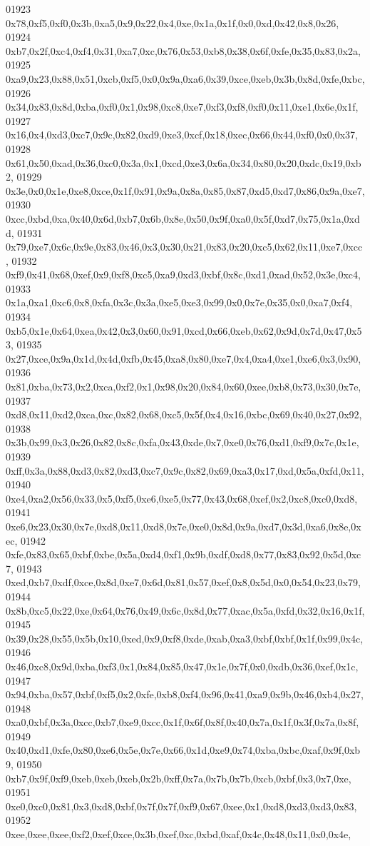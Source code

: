 \begin{DoxyCode}
01923   0x78,0xf5,0xf0,0x3b,0xa5,0x9,0x22,0x4,0xe,0x1a,0x1f,0x0,0xd,0x42,0x8,0x26,
01924   0xb7,0x2f,0xc4,0xf4,0x31,0xa7,0xc,0x76,0x53,0xb8,0x38,0x6f,0xfe,0x35,0x83,0x2a,
01925   0xa9,0x23,0x88,0x51,0xcb,0xf5,0x0,0x9a,0xa6,0x39,0xce,0xeb,0x3b,0x8d,0xfe,0xbc,
01926   0x34,0x83,0x8d,0xba,0xf0,0x1,0x98,0xc8,0xe7,0xf3,0xf8,0xf0,0x11,0xe1,0x6e,0x1f,
01927   0x16,0x4,0xd3,0xc7,0x9c,0x82,0xd9,0xe3,0xcf,0x18,0xec,0x66,0x44,0xf0,0x0,0x37,
01928   0x61,0x50,0xad,0x36,0xc0,0x3a,0x1,0xcd,0xe3,0x6a,0x34,0x80,0x20,0xdc,0x19,0xb2,
01929   0x3e,0x0,0x1e,0xe8,0xce,0x1f,0x91,0x9a,0x8a,0x85,0x87,0xd5,0xd7,0x86,0x9a,0xe7,
01930   0xcc,0xbd,0xa,0x40,0x6d,0xb7,0x6b,0x8e,0x50,0x9f,0xa0,0x5f,0xd7,0x75,0x1a,0xdd,
01931   0x79,0xe7,0x6c,0x9e,0x83,0x46,0x3,0x30,0x21,0x83,0x20,0xc5,0x62,0x11,0xe7,0xcc,
01932   0xf9,0x41,0x68,0xef,0x9,0xf8,0xc5,0xa9,0xd3,0xbf,0x8c,0xd1,0xad,0x52,0x3e,0xc4,
01933   0x1a,0xa1,0xc6,0x8,0xfa,0x3c,0x3a,0xe5,0xe3,0x99,0x0,0x7e,0x35,0x0,0xa7,0xf4,
01934   0xb5,0x1e,0x64,0xea,0x42,0x3,0x60,0x91,0xcd,0x66,0xeb,0x62,0x9d,0x7d,0x47,0x53,
01935   0x27,0xce,0x9a,0x1d,0x4d,0xfb,0x45,0xa8,0x80,0xe7,0x4,0xa4,0xe1,0xe6,0x3,0x90,
01936   0x81,0xba,0x73,0x2,0xca,0xf2,0x1,0x98,0x20,0x84,0x60,0xee,0xb8,0x73,0x30,0x7e,
01937   0xd8,0x11,0xd2,0xca,0xc,0x82,0x68,0xc5,0x5f,0x4,0x16,0xbc,0x69,0x40,0x27,0x92,
01938   0x3b,0x99,0x3,0x26,0x82,0x8c,0xfa,0x43,0xde,0x7,0xe0,0x76,0xd1,0xf9,0x7c,0x1e,
01939   0xff,0x3a,0x88,0xd3,0x82,0xd3,0xc7,0x9c,0x82,0x69,0xa3,0x17,0xd,0x5a,0xfd,0x11,
01940   0xe4,0xa2,0x56,0x33,0x5,0xf5,0xe6,0xe5,0x77,0x43,0x68,0xef,0x2,0xc8,0xc0,0xd8,
01941   0xe6,0x23,0x30,0x7e,0xd8,0x11,0xd8,0x7e,0xe0,0x8d,0x9a,0xd7,0x3d,0xa6,0x8e,0xec,
01942   0xfe,0x83,0x65,0xbf,0xbe,0x5a,0xd4,0xf1,0x9b,0xdf,0xd8,0x77,0x83,0x92,0x5d,0xc7,
01943   0xed,0xb7,0xdf,0xce,0x8d,0xe7,0x6d,0x81,0x57,0xef,0x8,0x5d,0x0,0x54,0x23,0x79,
01944   0x8b,0xc5,0x22,0xe,0x64,0x76,0x49,0x6c,0x8d,0x77,0xac,0x5a,0xfd,0x32,0x16,0x1f,
01945   0x39,0x28,0x55,0x5b,0x10,0xed,0x9,0xf8,0xde,0xab,0xa3,0xbf,0xbf,0x1f,0x99,0x4c,
01946   0x46,0xc8,0x9d,0xba,0xf3,0x1,0x84,0x85,0x47,0x1e,0x7f,0x0,0xdb,0x36,0xef,0x1c,
01947   0x94,0xba,0x57,0xbf,0xf5,0x2,0xfe,0xb8,0xf4,0x96,0x41,0xa9,0x9b,0x46,0xb4,0x27,
01948   0xa0,0xbf,0x3a,0xcc,0xb7,0xe9,0xcc,0x1f,0x6f,0x8f,0x40,0x7a,0x1f,0x3f,0x7a,0x8f,
01949   0x40,0xd1,0xfe,0x80,0xe6,0x5e,0x7e,0x66,0x1d,0xe9,0x74,0xba,0xbc,0xaf,0x9f,0xb9,
01950   0xb7,0x9f,0xf9,0xeb,0xeb,0xeb,0x2b,0xff,0x7a,0x7b,0x7b,0xcb,0xbf,0x3,0x7,0xe,
01951   0xe0,0xc0,0x81,0x3,0xd8,0xbf,0x7f,0x7f,0xf9,0x67,0xee,0x1,0xd8,0xd3,0xd3,0x83,
01952   0xee,0xee,0xee,0xf2,0xef,0xce,0x3b,0xef,0xc,0xbd,0xaf,0x4c,0x48,0x11,0x0,0x4e,

\end{DoxyCode}
